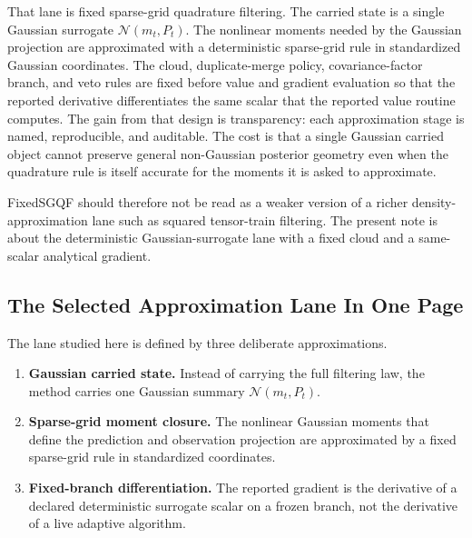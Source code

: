 \documentclass[11pt]{article}
\numberwithin{equation}{section}
\newcommand{\N}{\mathcal N}
\begin{document}
That lane is fixed sparse-grid quadrature filtering.  The carried state is a
single Gaussian surrogate \(\N(m_t,P_t)\).  The nonlinear moments needed by the
Gaussian projection are approximated with a deterministic sparse-grid rule in
standardized Gaussian coordinates.  The cloud, duplicate-merge policy,
covariance-factor branch, and veto rules are fixed before value and gradient
evaluation so that the reported derivative differentiates the same scalar that
the reported value routine computes.  The gain from that design is transparency:
each approximation stage is named, reproducible, and auditable.  The cost is
that a single Gaussian carried object cannot preserve general non-Gaussian
posterior geometry even when the quadrature rule is itself accurate for the
moments it is asked to approximate.

FixedSGQF should therefore not be read as a weaker version of a richer
density-approximation lane such as squared tensor-train filtering.  The present
note is about the deterministic Gaussian-surrogate lane with a fixed cloud and a
same-scalar analytical gradient.

\subsection{The Selected Approximation Lane In One Page}
\label{sec:p32-one-page}

The lane studied here is defined by three deliberate approximations.
\begin{enumerate}[leftmargin=0.28in]
  \item \textbf{Gaussian carried state.}  Instead of carrying the full filtering
  law, the method carries one Gaussian summary \(\N(m_t,P_t)\).
  \item \textbf{Sparse-grid moment closure.}  The nonlinear Gaussian moments that
  define the prediction and observation projection are approximated by a fixed
  sparse-grid rule in standardized coordinates.
  \item \textbf{Fixed-branch differentiation.}  The reported gradient is the
  derivative of a declared deterministic surrogate scalar on a frozen branch, not
  the derivative of a live adaptive algorithm.
\end{enumerate}
\end{document}
